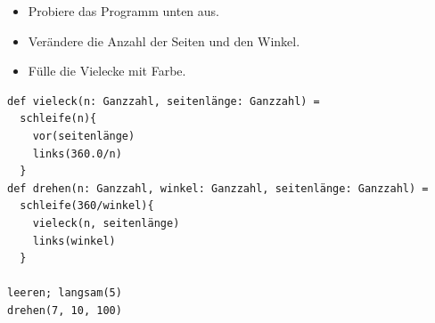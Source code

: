 \begin{itemize}

\item {Probiere das Programm unten aus.}
\item {Verändere die Anzahl der Seiten und den Winkel.}
\item {Fülle die Vielecke mit Farbe.}

\end{itemize}



  

\begin{lstlisting}[basicstyle={\ttfamily\fontsize{16}{19}\selectfont},numbers=none]
def vieleck(n: Ganzzahl, seitenlänge: Ganzzahl) = 
  schleife(n){
    vor(seitenlänge)
    links(360.0/n)
  }
def drehen(n: Ganzzahl, winkel: Ganzzahl, seitenlänge: Ganzzahl) = 
  schleife(360/winkel){ 
    vieleck(n, seitenlänge) 
    links(winkel) 
  }

leeren; langsam(5)
drehen(7, 10, 100)
\end{lstlisting}
        
